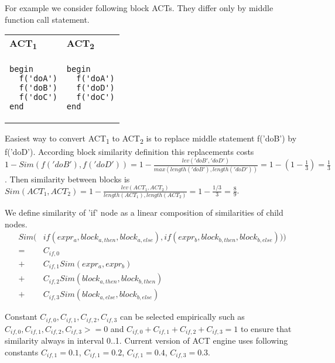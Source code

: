 \begin{exmp} For example we consider following block ACTs. They differ only by middle function call statement.\\
\begin{tabular}{ p{6cm} p{6cm} }
\textbf{ACT\textsubscript{1}} & \textbf{ACT\textsubscript{2}} \\
\begin{verbatim}
begin
  f('doA')
  f('doB')
  f('doC')
end
\end{verbatim} 
  &
\begin{verbatim}
begin
  f('doA')
  f('doD')
  f('doC')
end
\end{verbatim}
\end{tabular}

\noindent
Easiest way to convert ACT\textsubscript{1} to ACT\textsubscript{2} is to replace middle statement f('doB') by f('doD'). According block similarity definition this replacements costs  $1 - Sim(f('doB'), f('doD')) = 1 - \frac{lev('doB', 'doD')}{max(length('doB'), length('doD'))} = 1 - (1 - \frac{1}{3}) = \frac{1}{3}$. Then similarity between blocks is $Sim(ACT_1, ACT_2) = 1 - \frac{lev(ACT_1, ACT_2)}{length(ACT_1), length(ACT_2)} = 1 - \frac{1/3}{3} = \frac{8}{9}$.

\end{exmp}

\begin{mydef} We define similarity of 'if' node as a linear composition of similarities of child nodes. 
\begin{align*}
	Sim(&if(expr_a, block_{a,then}, block_{a,else}), if(expr_b, block_{b,then}, block_{b,else})))\\
	=& C_{if,0} \\
	+& C_{if,1} Sim(expr_a, expr_b) \\
	+& C_{if,2} Sim(block_{a,then}, block_{b,then}) \\
	+& C_{if,3} Sim(block_{a,else}, block_{b,else})
\end{align*}

Constant $C_{if,0}, C_{if,1}, C_{if,2}, C_{if,3}$ can be selected empirically such as $C_{if,0}, C_{if,1}, C_{if,2},
C_{if,3} >= 0$ and $C_{if,0} + C_{if,1} + C_{if,2} + C_{if,3} = 1$ to ensure that similarity always in interval 0..1.
Current version of ACT engine uses following constants $C_{if,1} = 0.1$, $C_{if,1} = 0.2$, $C_{if,1} = 0.4$, $C_{if,3} = 0.3$.
\end{mydef}

